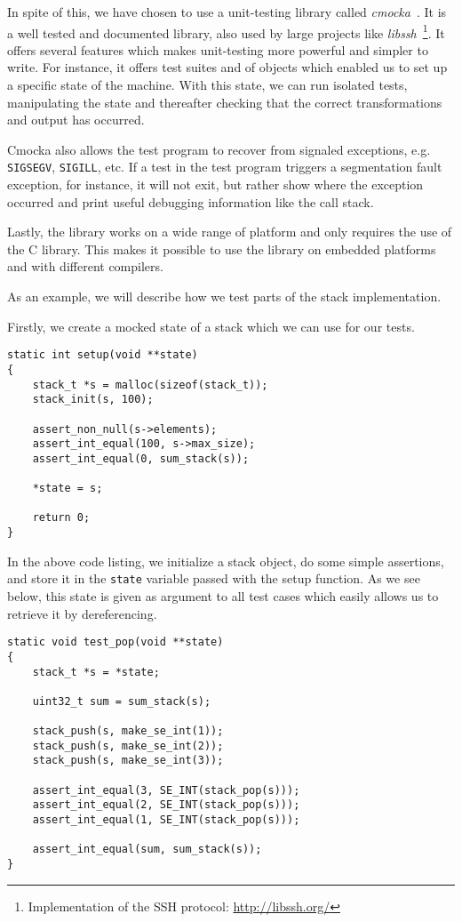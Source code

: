 In spite of this, we have chosen to use a unit-testing library called {\it
  cmocka}~\cite{cmocka}. It is a well tested and documented library, also used
by large projects like {\it libssh}~\footnote{Implementation of the SSH protocol:
  \url{http://libssh.org/}}. It offers several features which makes unit-testing
more powerful and simpler to write. For instance, it offers test suites and
 of objects which enabled us to set up a specific state of the
machine. With this state, we can run isolated tests, manipulating the state and
thereafter checking that the correct transformations and output has occurred.

Cmocka also allows the test program to recover from signaled exceptions,
e.g. {\tt SIGSEGV}, {\tt SIGILL}, etc. If a test in the test program triggers a
segmentation fault exception, for instance, it will not exit, but rather show
where the exception occurred and print useful debugging information like the
call stack.

Lastly, the library works on a wide range of platform and only requires the use
of the C library. This makes it possible to use the library on embedded
platforms and with different compilers.

As an example, we will describe how we test parts of the stack implementation.

Firstly, we create a mocked state of a stack which we can use for our tests.
\begin{lstlisting}[language={[ANSI]C},caption={Unit-test setup procedure}]
static int setup(void **state)
{
    stack_t *s = malloc(sizeof(stack_t));
    stack_init(s, 100);

    assert_non_null(s->elements);
    assert_int_equal(100, s->max_size);
    assert_int_equal(0, sum_stack(s));

    *state = s;

    return 0;
}
\end{lstlisting}

In the above code listing, we initialize a stack object, do some
simple assertions, and store it in the {\tt state} variable passed
with the setup function. As we see below, this state is given as
argument to all test cases which easily allows us to retrieve it by
dereferencing.
\begin{lstlisting}[language={[ANSI]C},caption={Unit-test of {\tt stack\_pop}}]
static void test_pop(void **state)
{
    stack_t *s = *state;

    uint32_t sum = sum_stack(s);

    stack_push(s, make_se_int(1));
    stack_push(s, make_se_int(2));
    stack_push(s, make_se_int(3));

    assert_int_equal(3, SE_INT(stack_pop(s)));
    assert_int_equal(2, SE_INT(stack_pop(s)));
    assert_int_equal(1, SE_INT(stack_pop(s)));

    assert_int_equal(sum, sum_stack(s));
}
\end{lstlisting}

